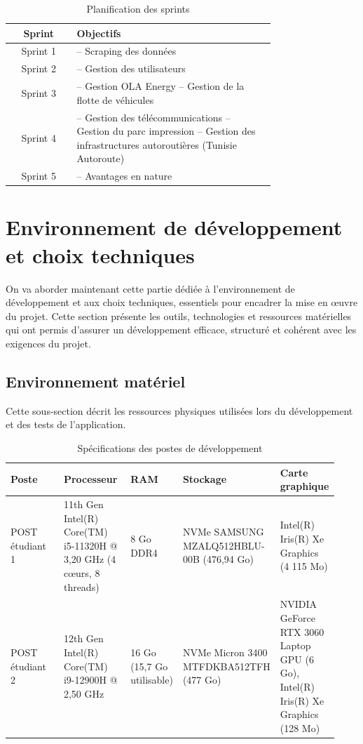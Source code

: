 \documentclass[a4paper,11pt]{report}
\begin{document}
\begin{table}[h]
\centering
\begin{tabular}{|c|p{0.75\linewidth}|}
\hline
\textbf{Sprint} & \textbf{Objectifs} \\
\hline
Sprint 1 & 
– Scraping des données \\
\hline
Sprint 2 & 
– Gestion des utilisateurs \\
\hline
Sprint 3 & 
– Gestion OLA Energy  
\newline – Gestion de la flotte de véhicules\\
\hline
Sprint 4 & 
– Gestion des télécommunications  
\newline – Gestion du parc impression  
\newline – Gestion des infrastructures autoroutières (Tunisie Autoroute) \\
\hline
Sprint 5 & – Avantages en nature               \\
\hline

\end{tabular}
\caption{Planification des sprints}
\end{table}

\section{Environnement de développement et choix techniques}

On va aborder maintenant cette partie dédiée à l’environnement de développement et aux choix techniques, essentiels pour encadrer la mise en œuvre du projet. Cette section présente les outils, technologies et ressources matérielles qui ont permis d’assurer un développement efficace, structuré et cohérent avec les exigences du projet.

\subsection{Environnement matériel}

Cette sous-section décrit les ressources physiques utilisées lors du développement et des tests de l’application.
\begin{table}[h]
\centering
\renewcommand{\arraystretch}{1.3} %
\begin{tabular}{|p{0.2\linewidth}|p{0.22\linewidth}|p{0.15\linewidth}|p{0.18\linewidth}|p{0.18\linewidth}|}
\hline
\textbf{Poste} & \textbf{Processeur} & \textbf{RAM} & \textbf{Stockage} & \textbf{Carte graphique} \\
\hline
POST étudiant 1 & 11th Gen Intel(R) Core(TM) i5-11320H @ 3,20 GHz (4 cœurs, 8 threads) & 8 Go DDR4 & NVMe SAMSUNG MZALQ512HBLU-00B (476,94 Go) & Intel(R) Iris(R) Xe Graphics (4 115 Mo) \\
\hline
POST étudiant 2 & 12th Gen Intel(R) Core(TM) i9-12900H @ 2,50 GHz & 16 Go (15,7 Go utilisable) & NVMe Micron 3400 MTFDKBA512TFH (477 Go) & NVIDIA GeForce RTX 3060 Laptop GPU (6 Go), Intel(R) Iris(R) Xe Graphics (128 Mo) \\
\hline
\end{tabular}
\caption{Spécifications des postes de développement}
\end{table}
\end{document}
